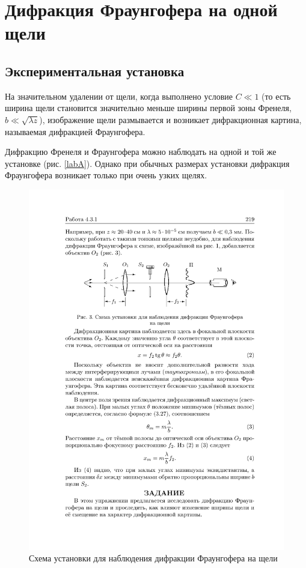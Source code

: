 \documentclass[a4paper,12pt]{article} %
\begin{document}
\section{Дифракция Фраунгофера на одной щели}

\subsection{Экспериментальная установка}

На значительном удалении от щели, когда выполнено условие $ C \ll 1 $
(то есть ширина щели становится значительно меньше ширины первой
зоны Френеля, $ b \ll \sqrt{\lambda z} $), изображение щели размывается и возникает
дифракционная картина, называемая дифракцией Фраунгофера.

Дифракцию Френеля и Фраунгофера можно наблюдать на одной
и той же установке (рис. \ref{labA}). Однако при обычных размерах установки дифракция Фраунгофера возникает только при очень узких щелях.

\begin{figure}[h!]
	\centering
	\includegraphics[width=0.8\linewidth]{b.pdf}
	\caption{Схема установки для наблюдения дифракции Фраунгофера на щели}
	\label{labB}
\end{figure}
\end{document}
